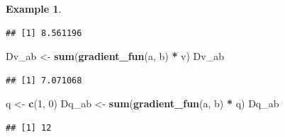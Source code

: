 \documentclass[
]{book}
\newenvironment{Shaded}{\begin{snugshade}}{\end{snugshade}}
\newcommand{\CommentTok}[1]{\textcolor[rgb]{0.56,0.35,0.01}{\textit{#1}}}
\newcommand{\DataTypeTok}[1]{\textcolor[rgb]{0.13,0.29,0.53}{#1}}
\newcommand{\DecValTok}[1]{\textcolor[rgb]{0.00,0.00,0.81}{#1}}
\newcommand{\KeywordTok}[1]{\textcolor[rgb]{0.13,0.29,0.53}{\textbf{#1}}}
\newcommand{\NormalTok}[1]{#1}
\newcommand{\OperatorTok}[1]{\textcolor[rgb]{0.81,0.36,0.00}{\textbf{#1}}}
\newcommand{\StringTok}[1]{\textcolor[rgb]{0.31,0.60,0.02}{#1}}
\theoremstyle{definition}
\theoremstyle{definition}
\newtheorem{example}{Example}[chapter]
\theoremstyle{definition}
\theoremstyle{definition}
\theoremstyle{remark}
\begin{document}
\begin{example}
\begin{Shaded}
\end{Shaded}

\begin{verbatim}
## [1] 8.561196
\end{verbatim}

\begin{Shaded}
\begin{Highlighting}[]
\NormalTok{Dv_ab <-}\StringTok{ }\KeywordTok{sum}\NormalTok{(}\KeywordTok{gradient_fun}\NormalTok{(a, b) }\OperatorTok{*}\StringTok{ }\NormalTok{v)}
\NormalTok{Dv_ab}
\end{Highlighting}
\end{Shaded}

\begin{verbatim}
## [1] 7.071068
\end{verbatim}

\begin{Shaded}
\begin{Highlighting}[]
\NormalTok{q <-}\StringTok{ }\KeywordTok{c}\NormalTok{(}\DecValTok{1}\NormalTok{, }\DecValTok{0}\NormalTok{)}
\NormalTok{Dq_ab <-}\StringTok{ }\KeywordTok{sum}\NormalTok{(}\KeywordTok{gradient_fun}\NormalTok{(a, b) }\OperatorTok{*}\StringTok{ }\NormalTok{q)}
\NormalTok{Dq_ab}
\end{Highlighting}
\end{Shaded}

\begin{verbatim}
## [1] 12
\end{verbatim}


\end{example}
\end{document}
